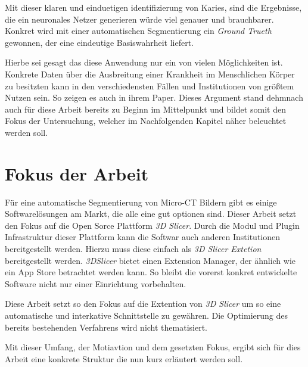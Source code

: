Mit dieser klaren und einduetigen identifizierung von Karies, sind die Ergebnisse,
die ein neuronales Netzer generieren würde viel genauer und brauchbarer. Konkret
wird mit einer automatischen Segmentierung ein \textit{Ground Trueth} gewonnen, der
eine eindeutige Basiswahrheit liefert.

Hierbe sei gesagt das diese Anwendung nur ein von vielen Möglichkeiten ist.
Konkrete Daten über die Ausbreitung einer Krankheit im Menschlichen Körper zu
besitzten kann in den verschiedensten Fällen und Institutionen von größtem
Nutzen sein. So zeigen es auch \citet{de20083d} in ihrem Paper. Dieses Argument stand
dehmnach auch für diese Arbeit bereits zu Beginn im Mittelpunkt und bildet somit
den Fokus der Untersuchung, welcher im Nachfolgenden Kapitel näher beleuchtet
werden soll.

\section{Fokus der Arbeit}
\label{sec:fokus_der-arbeit} Für eine automatische Segmentierung von Micro-CT
Bildern gibt es einige Softwarelösungen am Markt, die alle eine gut optionen sind.
Dieser Arbeit setzt den Fokus auf die Open Sorce Plattform \textit{3D Slicer}.
Durch die Modul und Plugin Infrastruktur dieser Plattform kann die Softwar auch
anderen Institutionen bereitgestellt werden. Hierzu muss diese einfach als \textit{3D
Slicer Extetion} bereitgestellt werden. \textit{3DSlicer} bietet einen Extension
Manager, der ähnlich wie ein App Store betrachtet werden kann. So bleibt die
vorerst konkret entwickelte Software nicht nur einer Einrichtung vorbehalten.

Diese Arbeit setzt so den Fokus auf die Extention von \textit{3D Slicer} um so eine
automatische und interkative Schnittstelle zu gewähren. Die Optimierung des
bereits bestehenden Verfahrens wird nicht thematisiert.

Mit dieser Umfang, der Motiavtion und dem gesetzten Fokus, ergibt sich für dies
Arbeit eine konkrete Struktur die nun kurz erläutert werden soll.

